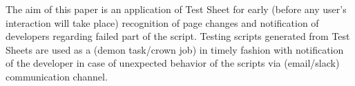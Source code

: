 	The aim of this paper is an application of Test Sheet for early (before any user's interaction will take place) recognition of page changes  and notification of developers regarding failed part of the script. Testing scripts generated from Test Sheets are used as a (demon task/crown job) in timely fashion with notification of the developer in case of unexpected behavior of the scripts via (email/slack) communication channel. 

	
	
	

